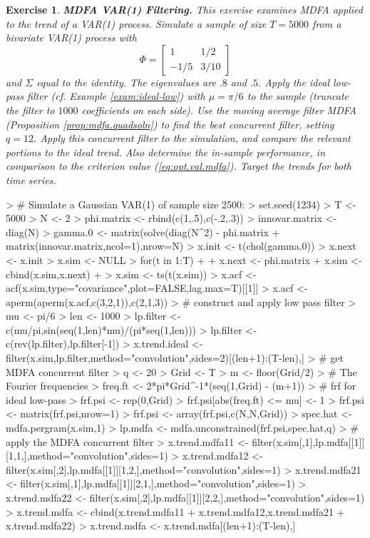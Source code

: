 \documentclass[a4paper]{book}
\newtheorem{Exercise}{Exercise}
\begin{document}
\begin{Exercise} {\bf MDFA VAR(1) Filtering.} \rm
\label{exer:var1mdfa.filter}
 This exercise examines MDFA applied to the trend of a  VAR(1) process.
Simulate a sample of size $T=5000$ from a
 bivariate VAR(1) process with 
\[
  \Phi = \left[ \begin{array}{cc} 1 & 1/2 \\ -1/5 & 3/10 \end{array} \right]
\]
 and $\Sigma$ equal to the identity.  The eigenvalues are $.8$ and $.5$.
  Apply the   ideal low-pass filter (cf. Example \ref{exam:ideal-low}) with 
  $\mu = \pi/6$ to the sample (truncate the filter to $1000$ coefficients on each side).  
 Use the moving average filter
 MDFA  (Proposition \ref{prop:mdfa.quadsoln}) to find the best
 concurrent filter, setting $q= 12$. 
 Apply this concurrent filter 
 to the simulation, and compare the relevant portions to the ideal trend.
 Also determine the in-sample performance, in comparison to the criterion value
 (\ref{eq:opt.val.mdfa}).
  Target the trends for both time series.
\end{Exercise}

\begin{Schunk}
\begin{Sinput}
> # Simulate a Gaussian VAR(1) of sample size 2500:
> set.seed(1234)
> T <- 5000
> N <- 2
> phi.matrix <- rbind(c(1,.5),c(-.2,.3))
> innovar.matrix <- diag(N)
> gamma.0 <- matrix(solve(diag(N^2) - phi.matrix %
+ 	matrix(innovar.matrix,ncol=1),nrow=N)
> x.init <- t(chol(gamma.0)) %
> x.next <- x.init
> x.sim <- NULL
> for(t in 1:T)
+ {
+ 	x.next <- phi.matrix %
+ 	x.sim <- cbind(x.sim,x.next)
+ }
> x.sim <- ts(t(x.sim))
> x.acf <- acf(x.sim,type="covariance",plot=FALSE,lag.max=T)[[1]]
> x.acf <- aperm(aperm(x.acf,c(3,2,1)),c(2,1,3))
> # construct and apply low pass filter
> mu <- pi/6
> len <- 1000
> lp.filter <- c(mu/pi,sin(seq(1,len)*mu)/(pi*seq(1,len)))
> lp.filter <- c(rev(lp.filter),lp.filter[-1])
> x.trend.ideal <- filter(x.sim,lp.filter,method="convolution",sides=2)[(len+1):(T-len),]
> # get MDFA concurrent filter
> q <- 20
> Grid <- T
> m <- floor(Grid/2)
> # The Fourier frequencies
> freq.ft <- 2*pi*Grid^{-1}*(seq(1,Grid) - (m+1))
> # frf for ideal low-pass
> frf.psi <- rep(0,Grid)
> frf.psi[abs(freq.ft) <= mu] <- 1
> frf.psi <- matrix(frf.psi,nrow=1) %
> frf.psi <- array(frf.psi,c(N,N,Grid))
> spec.hat <- mdfa.pergram(x.sim,1)	
> lp.mdfa <- mdfa.unconstrained(frf.psi,spec.hat,q)
> # apply the MDFA concurrent filter
> x.trend.mdfa11 <- filter(x.sim[,1],lp.mdfa[[1]][1,1,],method="convolution",sides=1)
> x.trend.mdfa12 <- filter(x.sim[,2],lp.mdfa[[1]][1,2,],method="convolution",sides=1)
> x.trend.mdfa21 <- filter(x.sim[,1],lp.mdfa[[1]][2,1,],method="convolution",sides=1)
> x.trend.mdfa22 <- filter(x.sim[,2],lp.mdfa[[1]][2,2,],method="convolution",sides=1)
> x.trend.mdfa <- cbind(x.trend.mdfa11 + x.trend.mdfa12,x.trend.mdfa21 + x.trend.mdfa22)
> x.trend.mdfa <- x.trend.mdfa[(len+1):(T-len),] 
\end{Sinput}
\end{Schunk}
\end{document}
